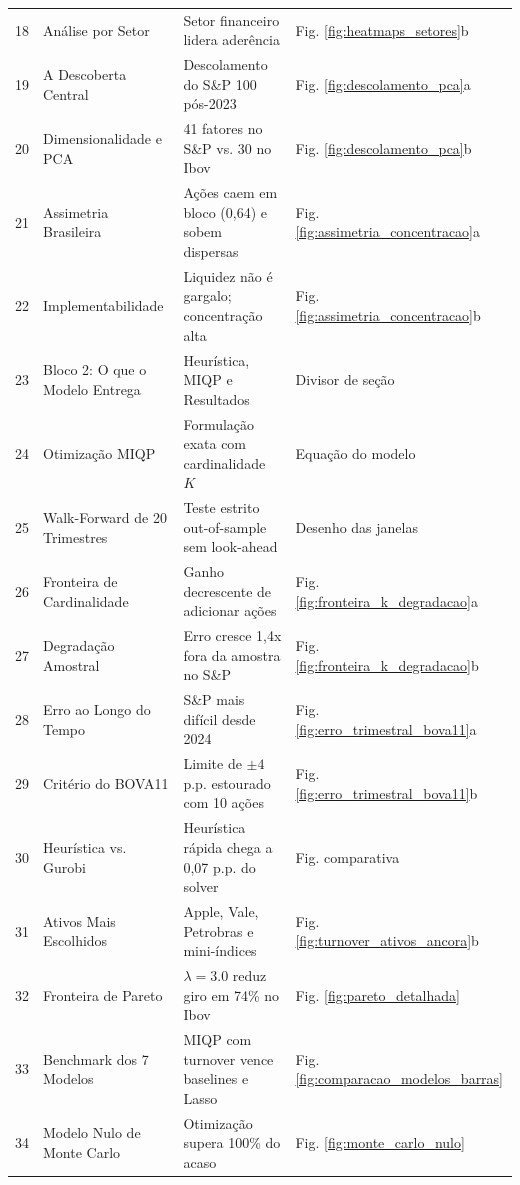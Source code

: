 \documentclass[11pt,a4paper]{article}
\begin{document}
\begin{longtable}{c p{} p{} p{}}
18 & Análise por Setor & Setor financeiro lidera aderência & Fig. \ref{fig:heatmaps_setores}b \\
19 & A Descoberta Central & Descolamento do S\&P 100 pós-2023 & Fig. \ref{fig:descolamento_pca}a \\
20 & Dimensionalidade e PCA & 41 fatores no S\&P vs. 30 no Ibov & Fig. \ref{fig:descolamento_pca}b \\
21 & Assimetria Brasileira & Ações caem em bloco (0,64) e sobem dispersas & Fig. \ref{fig:assimetria_concentracao}a \\
22 & Implementabilidade & Liquidez não é gargalo; concentração alta & Fig. \ref{fig:assimetria_concentracao}b \\
23 & Bloco 2: O que o Modelo Entrega & Heurística, MIQP e Resultados & Divisor de seção \\
24 & Otimização MIQP & Formulação exata com cardinalidade $K$ & Equação do modelo \\
25 & Walk-Forward de 20 Trimestres & Teste estrito out-of-sample sem look-ahead & Desenho das janelas \\
26 & Fronteira de Cardinalidade & Ganho decrescente de adicionar ações & Fig. \ref{fig:fronteira_k_degradacao}a \\
27 & Degradação Amostral & Erro cresce 1,4x fora da amostra no S\&P & Fig. \ref{fig:fronteira_k_degradacao}b \\
28 & Erro ao Longo do Tempo & S\&P mais difícil desde 2024 & Fig. \ref{fig:erro_trimestral_bova11}a \\
29 & Critério do BOVA11 & Limite de $\pm 4$ p.p. estourado com 10 ações & Fig. \ref{fig:erro_trimestral_bova11}b \\
30 & Heurística vs. Gurobi & Heurística rápida chega a 0,07 p.p. do solver & Fig. comparativa \\
31 & Ativos Mais Escolhidos & Apple, Vale, Petrobras e mini-índices & Fig. \ref{fig:turnover_ativos_ancora}b \\
32 & Fronteira de Pareto & $\lambda = 3.0$ reduz giro em 74\% no Ibov & Fig. \ref{fig:pareto_detalhada} \\
33 & Benchmark dos 7 Modelos & MIQP com turnover vence baselines e Lasso & Fig. \ref{fig:comparacao_modelos_barras} \\
34 & Modelo Nulo de Monte Carlo & Otimização supera 100\% do acaso & Fig. \ref{fig:monte_carlo_nulo} \\
\bottomrule
\end{longtable}

\newpage
\end{document}

